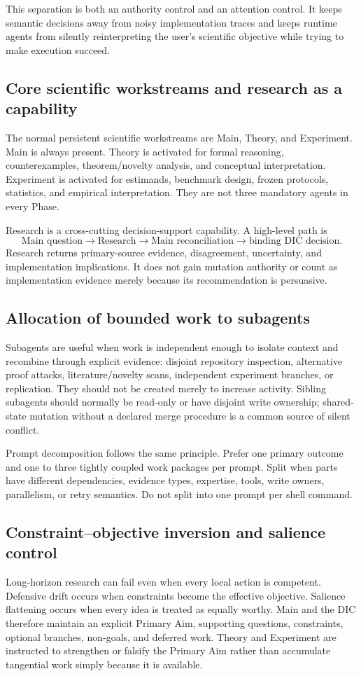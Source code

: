 \documentclass[11pt,a4paper]{article}
\begin{document}
This separation is both an authority control and an attention control. It keeps semantic decisions away from noisy implementation traces and keeps runtime agents from silently reinterpreting the user's scientific objective while trying to make execution succeed.

\subsection{Core scientific workstreams and research as a capability}
The normal persistent scientific workstreams are Main, Theory, and Experiment. Main is always present. Theory is activated for formal reasoning, counterexamples, theorem/novelty analysis, and conceptual interpretation. Experiment is activated for estimands, benchmark design, frozen protocols, statistics, and empirical interpretation. They are not three mandatory agents in every Phase.

Research is a cross-cutting decision-support capability. A high-level path is
\[
\text{Main question}\to\text{Research}\to\text{Main reconciliation}\to\text{binding DIC decision}.
\]
Research returns primary-source evidence, disagreement, uncertainty, and implementation implications. It does not gain mutation authority or count as implementation evidence merely because its recommendation is persuasive.

\subsection{Allocation of bounded work to subagents}\label{sec:subagent-allocation}
Subagents are useful when work is independent enough to isolate context and recombine through explicit evidence: disjoint repository inspection, alternative proof attacks, literature/novelty scans, independent experiment branches, or replication. They should not be created merely to increase activity. Sibling subagents should normally be read-only or have disjoint write ownership; shared-state mutation without a declared merge procedure is a common source of silent conflict.

Prompt decomposition follows the same principle. Prefer one primary outcome and one to three tightly coupled work packages per prompt. Split when parts have different dependencies, evidence types, expertise, tools, write owners, parallelism, or retry semantics. Do not split into one prompt per shell command.

\subsection{Constraint--objective inversion and salience control}
Long-horizon research can fail even when every local action is competent. Defensive drift occurs when constraints become the effective objective. Salience flattening occurs when every idea is treated as equally worthy. Main and the DIC therefore maintain an explicit Primary Aim, supporting questions, constraints, optional branches, non-goals, and deferred work. Theory and Experiment are instructed to strengthen or falsify the Primary Aim rather than accumulate tangential work simply because it is available.
\end{document}
